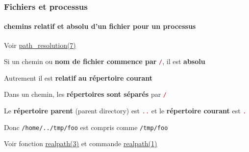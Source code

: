 \documentclass[xcolor=svgnames,final,smaller,a4]{beamer}
\begin{document}


\begin{frame}
  \frametitle{Fichiers et processus}
  \framesubtitle{chemins relatif et absolu d'un fichier pour un processus}

  Voir \href{https://man7.org/linux/man-pages/man7/path_resolution.7.html}{path\_resolution(7)}

  \vspace{0.3cm}
  
  Si un chemin ou \textbf{nom de fichier commence par} \textcolor{FireBrick}{\large\texttt{/}}, il est \textbf{absolu}

  \vspace{0.3cm}
  
  Autrement il est \textbf{relatif au répertoire courant}

  \vspace{0.3cm}
  
  Dans un chemin, les \textbf{répertoires sont séparés} par  \textcolor{FireBrick}{\large\texttt{/}}

  \vspace{0.3cm}
  
  Le \textbf{répertoire parent} (parent directory) est  \textcolor{FireBrick}{\large\texttt{..}} et le \textbf{répertoire courant} est  \textcolor{FireBrick}{\large\texttt{.}}

  \vspace{0.3cm}
  Donc \texttt{/home/../tmp/foo} est compris comme \texttt{/tmp/foo}
  \vspace{0.6cm}
  
  Voir fonction \href{https://man7.org/linux/man-pages/man3/realpath.3.html}{realpath(3)}
et commande   \href{https://man7.org/linux/man-pages/man1/realpath.1.html}{realpath(1)}
  
\end{frame}
\end{document}
